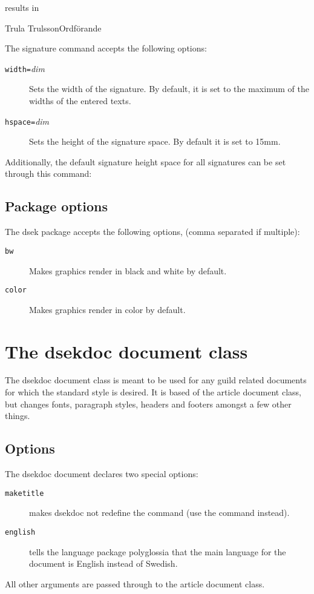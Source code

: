 \documentclass[a4paper, oneside]{ltxdoc}
\begin{document}
results in

\begin{center}
  \signature{Lund, dag som ovan}{Trula Trulsson}{Ordförande}
\end{center}

\noindent
The signature command accepts the following options:
\begin{description}
  \item[\texttt{width=}\textlangle\textit{dim}\textrangle] Sets the width of the
    signature.  By default, it is set to the maximum of the widths of the
    entered texts.
  \item[\texttt{hspace=}\textlangle\textit{dim}\textrangle] Sets the height of
    the signature space.  By default it is set to 15mm.
\end{description}

\noindent
Additionally, the default signature height space for all signatures can be set
through this command:
\begin{center}
\end{center}

\subsection{Package options}
The \textsf{dsek} package accepts the following options, (comma separated if
multiple):

\begin{description}
  \item[\texttt{bw}] Makes graphics render in black and white by default.
  \item[\texttt{color}] Makes graphics render in color by default.
\end{description}

\section{The \textsf{dsekdoc} document class}
The \textsf{dsekdoc} document class is meant to be used for any guild related
documents for which the standard style is desired.  It is based of the
\textsf{article} document class, but changes fonts, paragraph styles, headers
and footers amongst a few other things.

\subsection{Options}
The \textsf{dsekdoc} document declares two special options:
\begin{description}
\item[\texttt{maketitle}] makes \textsf{dsekdoc} not redefine the 
  command (use the  command instead).
\item[\texttt{english}] tells the language package \textsf{polyglossia} that
  the main language for the document is English instead of Swedish.
\end{description}
All other arguments are passed through to the \textsf{article} document class.
\end{document}
